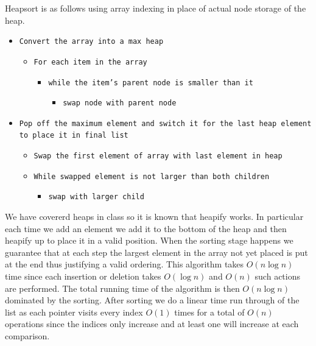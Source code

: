 \documentclass{amsart}
\begin{document}
Heapsort is as follows using array indexing in place of actual node storage of the heap.
{\small
    \begin{itemize}
        \item \texttt{Convert the array into a max heap}
            \begin{itemize}
                \item \texttt{For each item in the array}
                    \begin{itemize}
                        \item \texttt{while the item's parent node is smaller than it}
                            \begin{itemize}
                                \item \texttt{swap node with parent node}
                            \end{itemize}
                    \end{itemize}
            \end{itemize}
        \item \texttt{Pop off the maximum element and switch it for the last heap element to place it in final list}
            \begin{itemize}
                \item \texttt{Swap the first element of array with last element in heap}
                \item \texttt{While swapped element is not larger than both children}
                    \begin{itemize}
                        \item \texttt{swap with larger child}
                    \end{itemize}
            \end{itemize}
    \end{itemize}
}
We have covererd heaps in class so it is known that heapify works. In particular each time we add an element we add it to the bottom of the heap and then
heapify up to place it in a valid position. When the sorting stage happens we guarantee that at each step the largest element in the array not yet placed
is put at the end thus justifying a valid ordering. This algorithm takes $O(n\log n)$ time since each insertion or deletion takes $O(\log n)$ and $O(n)$ such
actions are performed.
The total running time of the algorithm is then $O(n \log n)$ dominated by the sorting. After sorting we do a linear time run through of the list as
each pointer visits every index $O(1)$ times for a total of $O(n)$ operations since the indices only increase and at least one will increase at each comparison.
\end{document}
